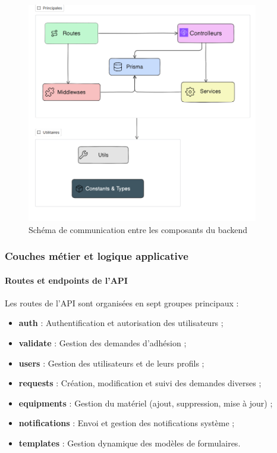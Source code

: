 \begin{figure}[H]
  \centering
  \includegraphics[width=0.9\textwidth]{images/backend/file.png}
  \caption{Schéma de communication entre les composants du backend}
  \label{fig:communication_backend}
\end{figure}

\subsubsection{Couches métier et logique applicative}

\paragraph{Routes et endpoints de l’API} Les routes de l'API sont organisées en sept groupes principaux :

\begin{itemize}
  \item \textbf{auth} : Authentification et autorisation des utilisateurs ;
  \item \textbf{validate} : Gestion des demandes d’adhésion ;
  \item \textbf{users} : Gestion des utilisateurs et de leurs profils ;
  \item \textbf{requests} : Création, modification et suivi des demandes diverses ;
  \item \textbf{equipments} : Gestion du matériel (ajout, suppression, mise à jour) ;
  \item \textbf{notifications} : Envoi et gestion des notifications système ;
  \item \textbf{templates} : Gestion dynamique des modèles de formulaires.
\end{itemize}


